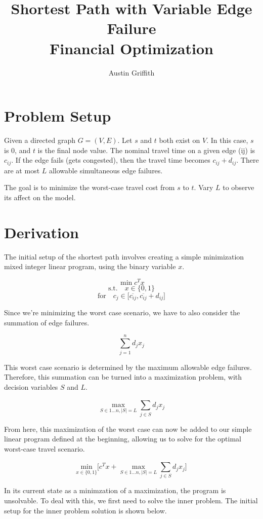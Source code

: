 \documentclass{article}
\title{Shortest Path with Variable Edge Failure \\ Financial Optimization}
\author{Austin Griffith}
\affil{Georgia Institute of Technology, Quantitative Finance}
\date{}
\begin{document}
	\maketitle

\section{Problem Setup}
Given a directed graph $G = (V,E)$. Let $s$ and $t$ both exist on $V$. In this case, $s$ is $0$, and $t$ is the final node value. The nominal travel time on a given edge (ij) is $c_{ij}$. If the edge fails (gets congested), then the travel time becomes $c_{ij} + d_{ij}$. There are at most $L$ allowable simultaneous edge failures.

The goal is to minimize the worst-case travel cost from $s$ to $t$. Vary $L$ to observe its affect on the model.

\section{Derivation}
The initial setup of the shortest path involves creating a simple minimization mixed integer linear program, using the binary variable $x$.

$$\min c^T x$$
$$
\textrm{s.t.} \quad x \in \{0,1\}
$$
$$
\textrm{for} \quad c_j \in \lbrack\overline{c_{ij}},\overline{c_{ij}} + d_{ij}\rbrack
$$

Since we're minimizing the worst case scenario, we have to also consider the summation of edge failures.

$$
\sum_{j=1}^{n}d_{j}x_{j}
$$

This worst case scenario is determined by the maximum allowable edge failures. Therefore, this summation can be turned into a maximization problem, with decision variables $S$ and $L$.

$$
\max_{S \in 1 ... n, |S| = L} \sum_{j \in S}^{}d_{j}x_{j}
$$

From here, this maximization of the worst case can now be added to our simple linear program defined at the beginning, allowing us to solve for the optimal worst-case travel scenario.

$$
\underset{x \in \{0,1\}}{\textrm{min}} \lbrack c^T x + \max_{S \in 1 ... n, |S| = L} \sum_{j \in S}^{}d_{j}x_{j} \rbrack
$$

In its current state as a minimzation of a maximization, the program is unsolvable. To deal with this, we first need to solve the inner problem. The initial setup for the inner problem solution is shown below.
\end{document}
